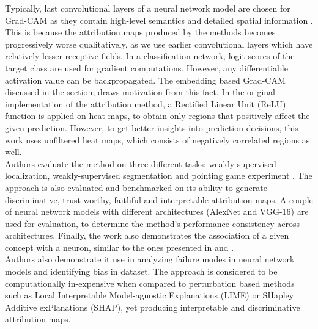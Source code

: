 \documentclass[../report.tex]{subfiles}
\begin{document}
	Typically, last convolutional layers of a neural network model are chosen for Grad-CAM as they contain high-level semantics and detailed spatial information \cite{selvaraju2017grad}. This is because the attribution maps produced by the methods becomes progressively worse qualitatively,  as we use earlier convolutional layers which have relatively lesser receptive fields. In a classification network, logit scores of the target class are used for gradient computations. However, any differentiable activation value can be backpropagated. The embedding based Grad-CAM discussed in the section, draws motivation from this fact. In the original implementation of the attribution method, a Rectified Linear Unit (ReLU) function is applied on heat maps, to obtain only regions that positively affect the given prediction. However, to get better insights into prediction decisions, this work uses unfiltered heat maps, which consists of negatively correlated regions as well.\\  
   Authors evaluate the method on three different tasks: weakly-supervised localization, weakly-supervised segmentation and pointing game experiment \cite{zhang2018top}. The approach is also evaluated and benchmarked on its ability to generate discriminative, trust-worthy, faithful and interpretable attribution maps. A couple of neural network models with different architectures (AlexNet \cite{krizhevsky2012imagenet} and VGG-16) are used for evaluation, to determine the method’s performance consistency across architectures.
   Finally, the work also demonstrates the association of a given concept with a neuron, similar to the ones presented in \cite{matthew2014visualizing} and \cite{zhou2014object}.\\
	Authors also demonstrate it use in analyzing failure modes in neural network models and identifying bias in dataset.
	The approach is considered to be computationally in-expensive when compared to perturbation based methods such as Local Interpretable Model-agnostic Explanations (LIME)\cite{lime} or SHapley Additive exPlanations (SHAP)\cite{shap}, yet producing interpretable and discriminative attribution maps.
	
\end{document}
